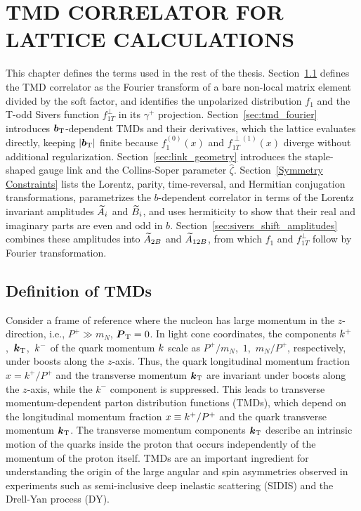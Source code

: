 \section{TMD CORRELATOR FOR LATTICE CALCULATIONS}
\label{sec:tmd_framework}

This chapter defines the terms used in the rest of the thesis. Section~\ref{sec:tmd_definition} defines the TMD correlator as the Fourier transform of a bare non-local matrix element divided by the soft factor, and identifies the unpolarized distribution $f_1$ and the T-odd Sivers function $f_{1T}^\perp$ in its $\gamma^+$ projection. Section~\ref{sec:tmd_fourier} introduces $\boldsymbol{b}_{\mathrm T}$-dependent TMDs and their derivatives, which the lattice evaluates directly, keeping $|\boldsymbol{b}_{\mathrm T}|$ finite because $f_{1}^{(0)} (x)$ and $f_{1T}^{\perp(1)}(x)$ diverge without additional regularization. Section~\ref{sec:link_geometry} introduces the staple-shaped gauge link and the Collins-Soper parameter $\hat\zeta$. Section~\ref{Symmetry Constraints} lists the Lorentz, parity, time-reversal, and Hermitian conjugation transformations, parametrizes the $b$-dependent correlator in terms of the Lorentz invariant amplitudes $\widetilde{A}_i$ and $\widetilde{B}_i$, and uses hermiticity to show that their real and imaginary parts are even and odd in $b$. Section~\ref{sec:sivers_shift_amplitudes} combines these amplitudes into $\widetilde{A}_{2B}$ and $\widetilde{A}_{12B}$, from which $f_1$ and $f_{1T}^\perp$ follow by Fourier transformation.

\subsection{Definition of TMDs} 
\label{sec:tmd_definition}
Consider a frame of reference where the nucleon has large momentum in the $z$-direction, i.e., $P^+ \gg m_N$, $\boldsymbol{P}_{\mathrm T} = 0$.
In light cone coordinates, the components $k^+$,~$\boldsymbol{k}_{\mathrm T}$,~$k^-$ of the quark momentum $k$ scale as $P^+/m_N$,~$1$,~$m_N/P^+$, respectively, under boosts along the $z$-axis. Thus, the quark longitudinal momentum fraction $x = k^+ / P^+$ and the transverse momentum $\boldsymbol{k}_{\mathrm T}$ are invariant under boosts along the $z$-axis, while the $k^-$ component is suppressed. 
This leads to transverse momentum-dependent parton distribution functions (TMDs), which depend on the longitudinal momentum fraction $x \equiv k^+ / P^+$ and the quark transverse momentum $\boldsymbol{k}_{\mathrm T}$. 
The transverse momentum components $\boldsymbol{k}_{\mathrm T}$ describe an intrinsic motion of the quarks inside the proton that occurs independently of the momentum of the proton itself. TMDs are an important ingredient for understanding the origin of the large angular and spin asymmetries observed in experiments such as semi-inclusive deep inelastic scattering (SIDIS) and the Drell-Yan process (DY).


